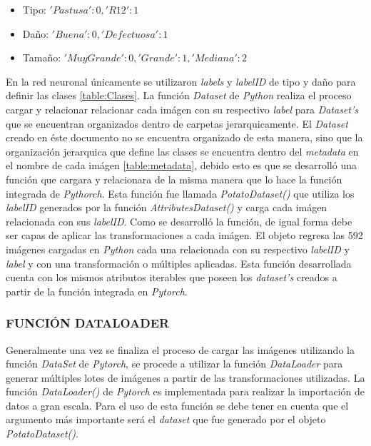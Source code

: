 			\begin{itemize}
				\item Tipo: ${'Pastusa': 0, 'R12': 1}$
				\item Daño: ${'Buena': 0, 'Defectuosa': 1}$
				\item Tamaño: ${'Muy Grande': 0, 'Grande': 1, 'Mediana': 2}$
			\end{itemize}

			En la red neuronal únicamente se utilizaron \textit{labels} y \textit{labelID} de tipo y daño para definir las clases \ref{table:Clases}. La función \textit{Dataset} de \textit{Python} realiza el proceso cargar y relacionar relacionar cada imágen con su respectivo \textit{label} para \textit{Dataset's} que se encuentran organizados dentro de carpetas jerarquicamente. El \textit{Dataset} creado en éste documento no se encuentra organizado de esta manera, sino que la organización jerarquica que define las clases se encuentra dentro del \textit{metadata} en el nombre de cada imágen \ref{table:metadata}, debido esto es que se desarrolló una función que cargara y relacionara de la misma manera que lo hace la función integrada de \textit{Pythorch}. Esta función fue llamada \textit{PotatoDataset()} que utiliza los \textit{labelID} generados por la función \textit{AttributesDataset()} y carga cada imágen relacionada con sus \textit{labelID}. Como se desarrolló la función, de igual forma debe ser capas de aplicar las transformaciones a cada imágen. El objeto regresa las 592 imágenes cargadas en \textit{Python} cada una relacionada con su respectivo \textit{labelID} y \textit{label} y con una transformación o múltiples aplicadas. Esta función desarrollada cuenta con los mismos atributos iterables que poseen los \textit{dataset's} creados a partir de la función integrada en \textit{Pytorch}.			
			
		
			\subsubsection{FUNCIÓN DATALOADER}			
						
			Generalmente una vez se finaliza el proceso de cargar las imágenes utilizando la función \textit{DataSet} de \textit{Pytorch}, se procede a utilizar la función \textit{DataLoader} para generar múltiples lotes de imágenes a partir de las transformaciones utilizadas. La función \textit{DataLoader()} de \textit{Pytorch} es implementada para realizar la importación de datos a gran escala. Para el uso de esta función se debe tener en cuenta que el argumento más importante será el \textit{dataset} que fue generado por el objeto \textit{PotatoDataset()}. \\
			
